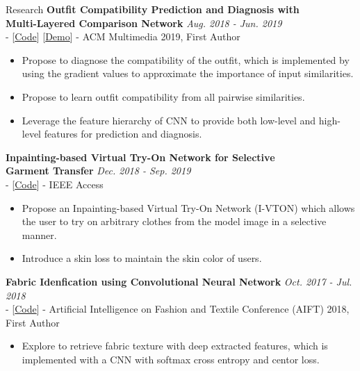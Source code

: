 \documentclass{resume} %
\begin{document}
\begin{rSection}{Research}
{\bf Outfit Compatibility Prediction and Diagnosis with \\ Multi-Layered Comparison Network} \hfill {\em Aug. 2018 - Jun. 2019}
\\ - [\href{https://github.com/WangXin93/fashion_compatibility_mcn}{Code}] [\href{https://outfit-diagnosis.herokuapp.com/}{Demo}] - ACM Multimedia 2019, First Author
\begin{itemize}
    \item Propose to diagnose the compatibility of the outfit, which is implemented by using the gradient values to approximate the importance of input similarities.
    \item Propose to learn outfit compatibility from all pairwise similarities.
    \item Leverage the feature hierarchy of CNN to provide both low-level and high-level features for prediction and diagnosis.
\end{itemize}

{\bf Inpainting-based Virtual Try-On Network for Selective \\ Garment Transfer} \hfill {\em Dec. 2018 - Sep. 2019}
\\ - [\href{https://github.com/maktu6/Inpaint-TON}{Code}] - IEEE Access
\begin{itemize}
    \item Propose an Inpainting-based Virtual Try-On Network (I-VTON) which allows the user to try on arbitrary clothes from the model image in a selective manner.
    \item Introduce a skin loss to maintain the skin color of users.
\end{itemize}

{\bf Fabric Idenfication using Convolutional Neural Network} \hfill {\em Oct. 2017 - Jul. 2018}
\\ - [\href{https://github.com/WangXin93/FabricID}{Code}] - Artificial Intelligence on Fashion and Textile Conference (AIFT) 2018, First Author
\begin{itemize}
    \item Explore to retrieve fabric texture with deep extracted features, which is implemented with a CNN with softmax cross entropy and centor loss.
\end{itemize}

\end{rSection}

\end{document}
